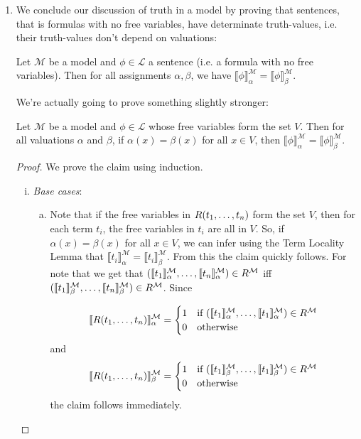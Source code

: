 \begin{enumerate}[\thesection.1]
		\item We conclude our discussion of truth in a model by proving that sentences, that is formulas with no free variables, have determinate truth-values, i.e. their truth-values don't depend on valuations:
		\begin{proposition}
		Let $\mathcal{M}$ be a model and $\phi\in\mathcal{L}$ a sentence (i.e. a formula with no free variables). Then for all assignments $\alpha,\beta$, we have $\llbracket\phi\rrbracket_\alpha^\mathcal{M}=\llbracket\phi\rrbracket_\beta^\mathcal{M}$.
		\end{proposition}
		We're actually going to prove something slightly stronger:
		\begin{lemma}
		Let $\mathcal{M}$ be a model and $\phi\in\mathcal{L}$ whose free variables form the set $V$. Then for all valuations $\alpha$ and $\beta$, if $\alpha(x)=\beta(x)$ for all $x\in V$, then $\llbracket\phi\rrbracket_\alpha^\mathcal{M}=\llbracket\phi\rrbracket_\beta^\mathcal{M}$.
		\end{lemma}
		\begin{proof}
		We prove the claim using induction.
		
		\begin{enumerate}[(i)]
		
			\item \emph{Base cases}: \begin{enumerate}[(a)]
			
				\item Note that if the free variables in  $R(t_1,\mathellipsis, t_n)$ form the set $V$, then for each term $t_i$, the free variables in $t_i$ are all in $V$. So, if $\alpha(x)=\beta(x)$ for all $x\in V$, we can infer using the Term Locality Lemma that $\llbracket t_i\rrbracket_\alpha^\mathcal{M}=\llbracket t_i\rrbracket_\beta^\mathcal{M}$.  From this the claim quickly follows. For note that we get that   $(\llbracket t_1\rrbracket_\alpha^\mathcal{M}, \mathellipsis, \llbracket t_n\rrbracket_\alpha^\mathcal{M})\in R^\mathcal{M}$ iff  $(\llbracket t_1\rrbracket_\beta^\mathcal{M}, \mathellipsis, \llbracket t_n\rrbracket_\beta^\mathcal{M})\in R^\mathcal{M}$. Since
				
				\[\llbracket R(t_1,\mathellipsis, t_n)\rrbracket_\alpha^\mathcal{M}=\begin{cases} 1 & \text{if }(\llbracket t_1\rrbracket^\mathcal{M}_\alpha,\mathellipsis, \llbracket t_1\rrbracket^\mathcal{M}_\alpha)\in R^\mathcal{M}\\0 &\text{otherwise}\end{cases}\]
				and 
				\[\llbracket R(t_1,\mathellipsis, t_n)\rrbracket_\beta^\mathcal{M}=\begin{cases} 1 & \text{if }(\llbracket t_1\rrbracket^\mathcal{M}_\beta,\mathellipsis, \llbracket t_1\rrbracket^\mathcal{M}_\beta)\in R^\mathcal{M}\\0 &\text{otherwise}\end{cases}\]
				the claim follows immediately.
				

\end{enumerate}
\end{enumerate}
\end{proof}
\end{enumerate}
